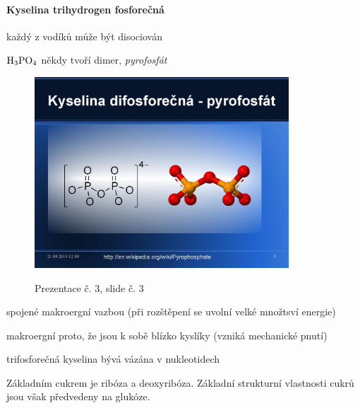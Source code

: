 \documentclass[DIV=8]{scrreprt}
\begin{document}
\paragraph{Kyselina trihydrogen fosforečná}
\begin{myItemize}[nosep]
    \item každý z vodíků může být disociován
    \item \(\ce{H3PO4}\) někdy tvoří dimer, \emph{pyrofosfát} \begin{figure}
    \caption{Prezentace č. 3, slide č. 3}
    \includegraphics[width=0.85\textwidth]{slides-3/slide-3.jpg}
    \centering
    \label{slides-3-slide-3}
\end{figure}

\begin{myItemize}[nosep]
    \item spojené makroergní vazbou (při rozštěpení se uvolní velké množtsví energie)
    \item makroergní proto, že jsou k sobě blízko kyslíky (vzniká mechanické pnutí)
\end{myItemize}

    \item trifosforečná kyselina bývá vázána v nukleotidech
\end{myItemize}




Základním cukrem je ribóza a deoxyribóza. Základní strukturní vlastnosti cukrů jsou však předvedeny na glukóze.
\end{document}
